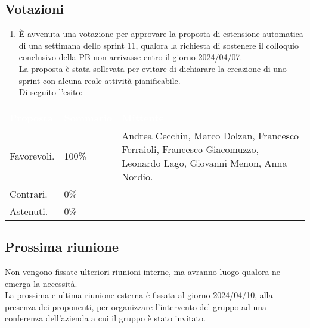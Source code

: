 \subsection{Votazioni} \label{subsec:resvotazione}
\begin{enumerate}
    \item È avvenuta una votazione per approvare la proposta di estensione automatica di una settimana dello sprint 11, qualora la richiesta di sostenere il colloquio conclusivo della PB non arrivasse entro il giorno 2024/04/07.\\
    La proposta è stata sollevata per evitare di dichiarare la creazione di uno sprint con alcuna reale attività pianificabile.\\
    Di seguito l'esito:
\end{enumerate}
\begingroup
    \setlength{\tabcolsep}{10pt}
    \renewcommand{\arraystretch}{1.5}
    \begin{tabularx}{\textwidth}{| l | l | X |}
         \hline
         \rowcolor{headerrow}\textbf{\textcolor{white}{Proposta}} & \textbf{\textcolor{white}{Sommario}} & \textbf{\textcolor{white}{Mittente}} \\
         \hline
         Favorevoli. & 100\%  & Andrea Cecchin, Marco Dolzan, Francesco Ferraioli, Francesco Giacomuzzo, Leonardo Lago, Giovanni Menon, Anna Nordio.\\
         \hline
         Contrari. & 0\% &  \\
         \hline
         Astenuti. & 0\% &  \\
         \hline
    \end{tabularx}
\endgroup

\subsection{Prossima riunione} \label{subsec:riunione}


Non vengono fissate ulteriori riunioni interne, ma avranno luogo qualora ne emerga la necessità.\\
La prossima e ultima riunione esterna è fissata al giorno 2024/04/10, alla presenza dei proponenti, per organizzare l'intervento del gruppo ad una conferenza dell'azienda a cui il gruppo è stato invitato.

